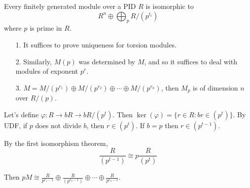 \documentclass[a4paper,twoside,master.tex]{subfiles}
\begin{document}
\begin{theorem}
    Every finitely generated module over a PID $ R $ is isomorphic to
    \begin{equation}
        R^n \oplus \bigoplus_p R/(p^{t_i})
    \end{equation}
    where $ p $ is prime in $ R $.
\end{theorem}
\begin{itemize}
    \item[1.] It suffices to prove uniqueness for torsion modules.
    \item[2.] Similarly, $ M(p) $ was determined by $ M $, and so it suffices to deal with modules of exponent $ p^r $.
    \item[3.] $ M = M/(p^{r_1}) \oplus M/(p^{r_2}) \oplus \cdots \oplus M/(p^{r_n}) $, then $ M_p $ is of dimension $ n $ over $ R/(p) $. 
\end{itemize}

Let's define $ \varphi \colon R \to bR \to bR/(p^t) $. Then $ \ker(\varphi) = \{r \in R \colon b r \in (p^t)\} $. By UDF, if $ p $ does not divide $ b $, then $ r \in (p^t) $. If $ b = p $ then $ r \in (p^{t-1}) $.

By the first isomorphism theorem,
\begin{equation}
    \frac{R}{(p^{t-1})} \cong p \frac{R}{(p^t)}
\end{equation}

Then $ p M \cong \frac{R}{p^{r_1 - 1}} \oplus \frac{R}{(p^{r_2 - 1})} \oplus \cdots \oplus \frac{R}{p^{r_n - 1}} $.
\end{document}
